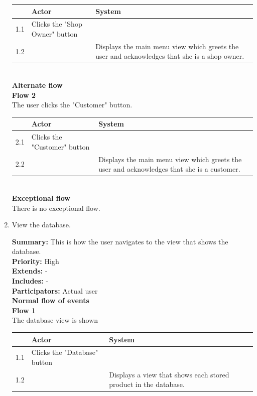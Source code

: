 \documentclass{report}
\begin{document}
\begin{enumerate}
    \begin{tabular}{ | l | p{4cm} | p{4cm} |}
    \hline
      & Actor & System \\ \hline
    1.1 & Clicks the "Shop Owner" button & \\ \hline
    1.2 & & Displays the main menu view which greets the user and acknowledges that she is a shop owner. \\
    \hline
    \end{tabular} \\

    \textbf{Alternate flow} \\
    \textbf{Flow 2} \\ The user clicks the "Customer" button. \\

    \begin{tabular}{ | l | p{4cm} | p{4cm} |}
    \hline
      & Actor & System \\ \hline
    2.1 & Clicks the "Customer" button & \\ \hline
    2.2 & & Displays the main menu view which greets the user and acknowledges that she is a customer. \\
    \hline
    \end{tabular} \\

    \textbf{Exceptional flow} \\ There is no exceptional flow.

\pagebreak

  \item View the database. \

    \textbf{Summary:} This is how the user navigates to the view that shows the database. \\
    \textbf{Priority:} High \\
    \textbf{Extends:} - \\
    \textbf{Includes:} - \\
    \textbf{Participators:} Actual user \\
    \textbf{Normal flow of events} \\
    \textbf{Flow 1} \\ The database view is shown \\

    \begin{tabular}{ | l | p{4cm} | p{4cm} |}
    \hline
      & Actor & System \\ \hline
    1.1 & Clicks the "Database" button & \\ \hline
    1.2 & & Displays a view that shows each stored product in the database. \\
    \hline
    \end{tabular} \\


\end{enumerate}
\end{document}
